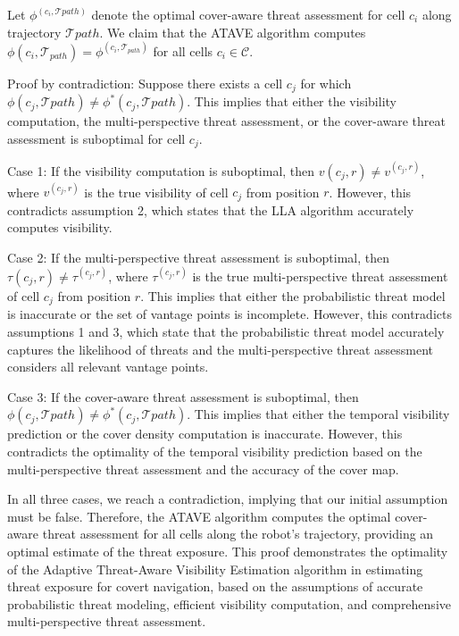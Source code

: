 Let $\phi^(c_i, \mathcal{T}{path})$ denote the optimal cover-aware threat assessment for cell $c_i$ along trajectory $\mathcal{T}{path}$. We claim that the ATAVE algorithm computes $\phi(c_i, \mathcal{T}_{path}) = \phi^(c_i, \mathcal{T}_{path})$ for all cells $c_i \in \mathcal{C}$.

Proof by contradiction: Suppose there exists a cell $c_j$ for which $\phi(c_j, \mathcal{T}{path}) \neq \phi^*(c_j, \mathcal{T}{path})$. This implies that either the visibility computation, the multi-perspective threat assessment, or the cover-aware threat assessment is suboptimal for cell $c_j$.

Case 1: If the visibility computation is suboptimal, then $v(c_j, r) \neq v^(c_j, r)$, where $v^(c_j, r)$ is the true visibility of cell $c_j$ from position $r$. However, this contradicts assumption 2, which states that the LLA algorithm accurately computes visibility.

Case 2: If the multi-perspective threat assessment is suboptimal, then $\tau(c_j, r) \neq \tau^(c_j, r)$, where $\tau^(c_j, r)$ is the true multi-perspective threat assessment of cell $c_j$ from position $r$. This implies that either the probabilistic threat model is inaccurate or the set of vantage points is incomplete. However, this contradicts assumptions 1 and 3, which state that the probabilistic threat model accurately captures the likelihood of threats and the multi-perspective threat assessment considers all relevant vantage points.

Case 3: If the cover-aware threat assessment is suboptimal, then $\phi(c_j, \mathcal{T}{path}) \neq \phi^*(c_j, \mathcal{T}{path})$. This implies that either the temporal visibility prediction or the cover density computation is inaccurate. However, this contradicts the optimality of the temporal visibility prediction based on the multi-perspective threat assessment and the accuracy of the cover map.

In all three cases, we reach a contradiction, implying that our initial assumption must be false. Therefore, the ATAVE algorithm computes the optimal cover-aware threat assessment for all cells along the robot's trajectory, providing an optimal estimate of the threat exposure.
This proof demonstrates the optimality of the Adaptive Threat-Aware Visibility Estimation algorithm in estimating threat exposure for covert navigation, based on the assumptions of accurate probabilistic threat modeling, efficient visibility computation, and comprehensive multi-perspective threat assessment.

